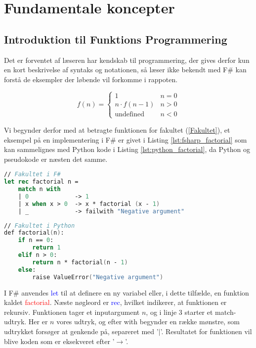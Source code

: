 
\section{Fundamentale koncepter}
\subsection{Introduktion til Funktions Programmering}

Det er forventet af læseren har kendskab til programmering, der gives derfor kun en kort beskrivelse af syntaks og notationen, så læser ikke bekendt med F\# kan forstå de eksempler der løbende vil forkomme i rappoten.

\begin{equation}
    \label{Fakultet}
    f(n) = \begin{cases} 
            1 &  n = 0  \\
            n \cdot f(n-1) & n > 0 \\
            \text{undefined} & n < 0 
           \end{cases}
\end{equation}

Vi begynder derfor med at betragte funktionen for fakultet (\ref{Fakultet}), et eksempel på en implementering i F\# er givet i Listing \ref{lst:fsharp_factorial} som kan sammelignes med Python kode i Listing \ref{lst:python_factorial}, da Python og pseudokode er næsten det samme. 

\begin{lstlisting}[language={FSharp}, label={lst:fsharp_factorial}, caption={Eksempel på Fakultet i F\#}]
// Fakultet i F#
let rec factorial n =
    match n with
    | 0             -> 1 
    | x when x > 0  -> x * factorial (x - 1)
    | _             -> failwith "Negative argument"
\end{lstlisting}

\begin{lstlisting}[language={FSharp}, label={lst:python_factorial}, caption={Eksempel på Fakultet i Python}]
// Fakultet i Python
def factorial(n):
    if n == 0:
        return 1
    elif n > 0:
        return n * factorial(n - 1)
    else:
        raise ValueError("Negative argument")
\end{lstlisting}

I F\# anvendes \textcolor{blue}{let} til at definere en ny variabel eller, i dette tilfælde, en funktion kaldet \textcolor{red}{factorial}. Næste nøgleord er \textcolor{blue}{rec}, hvilket indikerer, at funktionen er rekursiv. Funktionen tager et inputargument \(n\), og i linje 3 starter et match-udtryk. Her er \(n\) vores udtryk, og efter \textcolor{codepurple}{with} begynder en række mønstre, som udtrykket forsøger at genkende på, separeret med '$\vert$'. Resultatet for funktionen vil blive koden som er eksekveret efter  '$\rightarrow$'.


